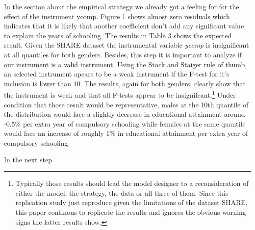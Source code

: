 \documentclass[12pt,a4paper]{article}
\let\rmarkdownfootnote\footnote%
\def\footnote{\protect\rmarkdownfootnote}
\begin{document}
In the section about the empirical strategy we already got a feeling for
for the effect of the instrument ycomp. Figure 1 shows almost zero
residuals which indicates that it is likely that another coefficient
don't add any significant value to explain the years of schooling. The
results in Table 3 shows the expected result. Given the SHARE dataset
the instrumental variable \textit{ycomp} is insignificant at all
quantiles for both genders. Besides, this step it is important to
analyze if our instrument is a valid instrument. Using the Stock and
Staiger rule of thumb, an selected instrument apears to be a weak
instrument if the F-test for it's inclusion is lower than 10. The
results, again for both genders, clearly show that the instrument is
weak and that all F-tests appear to be insignifcant.\footnote{Typically
  those results should lead the model designer to a reconsideration of
  either the model, the strategy, the data or all three of them. Since
  this replication study just reproduce given the limitations of the
  dataset SHARE, this paper continous to replicate the results and
  ignores the obvious warning signs the latter results show.} Under
condition that those result would be representative, males at the 10th
quantile of the distribution would face a slightly decrease in
educational attainment around -0.5\% per extra year of compulsory
schooling while females at the same quantile would face an increase of
roughly 1\% in educational attainment per extra year of compulsory
schooling.

In the next step
\end{document}
